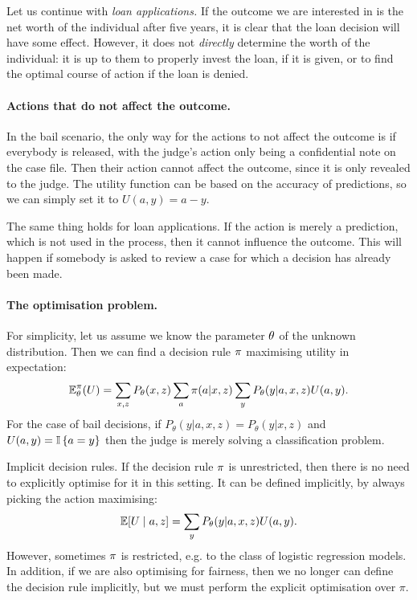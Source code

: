 \documentclass{beamer}
\begin{document}
\begin{frame}
{    Let us continue with \emph{loan applications.} If the outcome we are
    interested in is the net worth of the individual after five years,
    it is clear that the loan decision will have some effect. However,
    it does not \emph{directly} determine the worth of the individual:
    it is up to them to properly invest the loan, if it is given, or
    to find the optimal course of action if the loan is denied.

    \paragraph{Actions that do not affect the outcome.} In the bail
    scenario, the only way for the actions to not affect the outcome
    is if everybody is released, with the judge's action only being a
    confidential note on the case file. Then their action cannot
    affect the outcome, since it is only revealed to the judge. The
    utility function can be based on the accuracy of predictions, so
    we can simply set it to $U(a,y) = a - y$.

    The same thing holds for loan applications. If the action is
    merely a prediction, which is not used in the process, then it
    cannot influence the outcome. This will happen if somebody is
    asked to review a case for which a decision has already been made.
    
    \paragraph{The optimisation problem.} For simplicity, let us assume we know the parameter $\theta$ of the unknown distribution. Then we can find a decision rule $\pi$ maximising utility in expectation:
    \begin{equation} 
      \label{eq:expected-utility-judge}
      \mathop{\mbox{\ensuremath{\mathbb{E}}}}\nolimits_\theta^\pi(U) = \sum_{x,z} P_\theta(x, z) \sum_a \pi(a | x, z) \sum_y P_\theta(y | a, x, z) U(a,y).
    \end{equation}
    For the case of bail decisions, if $P_\theta(y | a, x, z) =P_\theta(y | x, z)$ and $U(a,y) = \mathop{\mbox{\ensuremath{\mathbb{I}}}}\left\{a = y\right\}$ then the judge is merely solving a classification problem.

    \begin{theoryblock}{Implicit decision rules.}
      If the decision rule $\pi$ is unrestricted, then there is no
      need to explicitly optimise for it in this setting. It can be defined implicitly, by always picking the action maximising:
      \[
        \mathop{\mbox{\ensuremath{\mathbb{E}}}}\nolimits[U \mid a, z] = \sum_y P_\theta(y | a, x, z) U(a,y).
      \]
      However, sometimes $\pi$ is restricted, e.g. to the class of logistic regression models. In addition, if we are also optimising for fairness, then we no longer can define the decision rule implicitly, but we must perform the explicit optimisation over $\pi$.
\end{theoryblock}


}
\end{frame}
\end{document}
